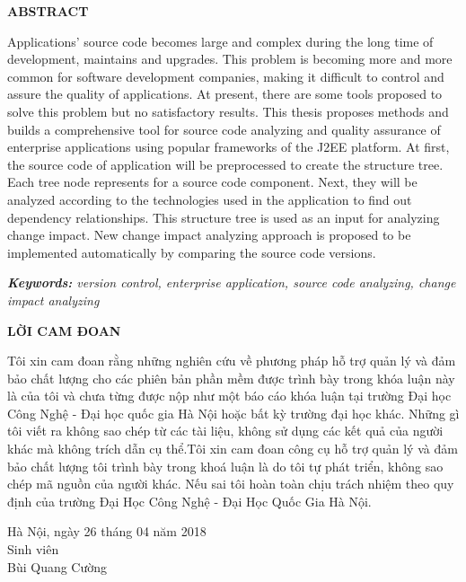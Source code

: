 \documentclass[12pt]{report}
\begin{document}
\newpage
\begin{titlepage}
\begin{center}
	\textbf{\large ABSTRACT}
\end{center}
Applications' source code becomes large and complex during the long time of development, maintains and upgrades. This problem is becoming more and more common for software development companies, making it difficult to control and assure the quality of applications. At present, there are some tools proposed to solve this problem but no satisfactory results. This thesis proposes methods and builds a comprehensive tool for source code analyzing and quality assurance of enterprise applications using popular frameworks of the J2EE platform. At first, the source code of application will be preprocessed to create the structure tree. Each tree node represents for a source code component. Next, they will be analyzed according to the technologies used in the application to find out dependency relationships. This structure tree is used as an input for analyzing change impact. New change impact analyzing approach is proposed to be implemented automatically by comparing the source code versions.

\noindent \textit{\textbf{Keywords:} version control, enterprise application, source code analyzing, change impact analyzing}
\end{titlepage}

\newpage
\begin{titlepage}
\begin{center}
	\textbf{\large LỜI CAM ĐOAN}
\end{center}
Tôi xin cam đoan rằng những nghiên cứu về phương pháp hỗ trợ quản lý và đảm bảo chất lượng cho các phiên bản phần mềm được trình bày trong khóa luận này là của tôi và chưa từng được nộp như một báo cáo khóa luận tại trường Đại học Công Nghệ - Đại học quốc gia Hà Nội hoặc bất kỳ trường đại học khác. Những gì tôi viết ra không sao chép từ các tài liệu, không sử dụng các kết quả của người khác mà không trích dẫn cụ thể.Tôi xin cam đoan công cụ hỗ trợ quản lý và đảm bảo chất lượng tôi trình bày trong khoá luận là do tôi tự phát triển, không sao chép mã nguồn của người khác. Nếu sai tôi hoàn toàn chịu trách nhiệm theo quy định của trường Đại Học Công Nghệ - Đại Học Quốc Gia Hà Nội.\\

\begin{flushright}
	\begin{varwidth}{\linewidth}\centering
		Hà Nội, ngày 26 tháng 04 năm 2018\\
		Sinh viên\\[2cm]
		Bùi Quang Cường
	\end{varwidth}
\end{flushright}
\end{titlepage}
\end{document}
